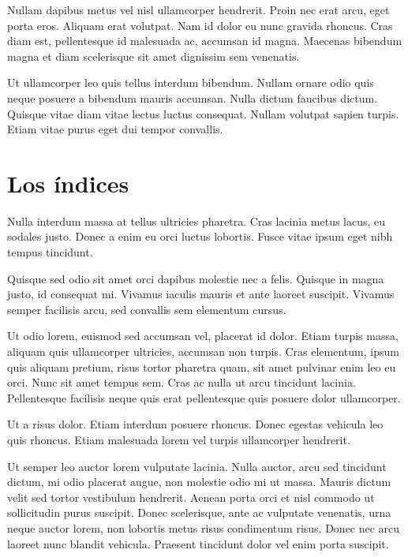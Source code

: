 \documentclass[12pt,a4paper]{report}
\begin{document}
Nullam dapibus metus vel nisl ullamcorper hendrerit. Proin nec erat arcu, eget porta eros. Aliquam erat volutpat. Nam id dolor eu nunc gravida rhoncus. Cras diam est, pellentesque id malesuada ac, accumsan id magna. Maecenas bibendum magna et diam scelerisque sit amet dignissim sem venenatis. 

Ut ullamcorper leo quis tellus interdum bibendum. Nullam ornare odio quis neque posuere a bibendum mauris accumsan. Nulla dictum faucibus dictum. Quisque vitae diam vitae lectus luctus consequat. Nullam volutpat sapien turpis. Etiam vitae purus eget dui tempor convallis. 





\section{Los índices}
\label{seccion.indice}



Nulla interdum massa at tellus ultricies pharetra. Cras lacinia metus lacus, eu sodales justo. Donec a enim eu orci luctus lobortis. Fusce vitae ipsum eget nibh tempus tincidunt.

Quisque sed odio sit amet orci dapibus molestie nec a felis. Quisque in magna justo, id consequat mi. Vivamus iaculis mauris et ante laoreet suscipit. Vivamus semper facilisis arcu, sed convallis sem elementum cursus. 

Ut odio lorem, euismod sed accumsan vel, placerat id dolor. Etiam turpis massa, aliquam quis ullamcorper ultricies, accumsan non turpis. Cras elementum, ipsum quis aliquam pretium, risus tortor pharetra quam, sit amet pulvinar enim leo eu orci. Nunc sit amet tempus sem. Cras ac nulla ut arcu tincidunt lacinia. Pellentesque facilisis neque quis erat pellentesque quis posuere dolor ullamcorper. 

Ut a risus dolor. Etiam interdum posuere rhoncus. Donec egestas vehicula leo quis rhoncus. Etiam malesuada lorem vel turpis ullamcorper hendrerit.

Ut semper leo auctor lorem vulputate lacinia. Nulla auctor, arcu sed tincidunt dictum, mi odio placerat augue, non molestie odio mi ut massa. Mauris dictum velit sed tortor vestibulum hendrerit. Aenean porta orci et nisl commodo ut sollicitudin purus suscipit. Donec scelerisque, ante ac vulputate venenatis, urna neque auctor lorem, non lobortis metus risus condimentum risus. Donec nec arcu laoreet nunc blandit vehicula. Praesent tincidunt dolor vel enim porta suscipit. 
\end{document}
